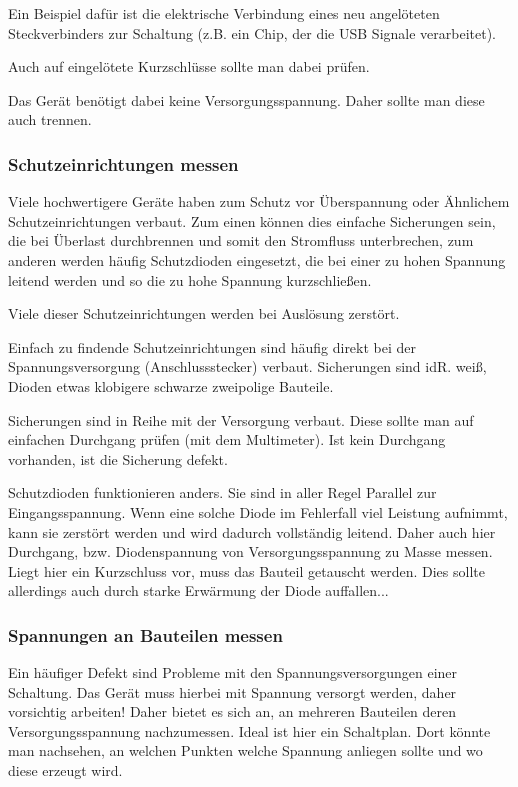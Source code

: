 Ein Beispiel dafür ist die elektrische Verbindung eines neu angelöteten Steckverbinders zur Schaltung (z.B. ein Chip, der die USB Signale verarbeitet).

Auch auf eingelötete Kurzschlüsse sollte man dabei prüfen.

Das Gerät benötigt dabei keine Versorgungsspannung.
Daher sollte man diese auch trennen.

\subsubsection{Schutzeinrichtungen messen}

Viele hochwertigere Geräte haben zum Schutz vor Überspannung oder Ähnlichem Schutzeinrichtungen verbaut.
Zum einen können dies einfache Sicherungen sein, die bei Überlast durchbrennen und somit den Stromfluss unterbrechen, zum anderen werden häufig Schutzdioden eingesetzt, die bei einer zu hohen Spannung leitend werden und so die zu hohe Spannung kurzschließen.

Viele dieser Schutzeinrichtungen werden bei Auslösung zerstört.

Einfach zu findende Schutzeinrichtungen sind häufig direkt bei der Spannungsversorgung (Anschlussstecker) verbaut. Sicherungen sind idR. weiß, Dioden etwas klobigere schwarze zweipolige Bauteile.

Sicherungen sind in Reihe mit der Versorgung verbaut. Diese sollte man auf einfachen Durchgang prüfen (mit dem Multimeter). Ist kein Durchgang vorhanden, ist die Sicherung defekt.

Schutzdioden funktionieren anders. Sie sind in aller Regel Parallel zur Eingangsspannung. Wenn eine solche Diode im Fehlerfall viel Leistung aufnimmt, kann sie zerstört werden und wird dadurch vollständig leitend. Daher auch hier Durchgang, bzw. Diodenspannung von Versorgungsspannung zu Masse messen.
Liegt hier ein Kurzschluss vor, muss das Bauteil getauscht werden. Dies sollte allerdings auch durch starke Erwärmung der Diode auffallen...

\subsubsection{Spannungen an Bauteilen messen}

Ein häufiger Defekt sind Probleme mit den Spannungsversorgungen einer Schaltung.
Das Gerät muss hierbei mit Spannung versorgt werden, daher vorsichtig arbeiten!
Daher bietet es sich an, an mehreren Bauteilen deren Versorgungsspannung nachzumessen.
Ideal ist hier ein Schaltplan. Dort könnte man nachsehen, an welchen Punkten welche Spannung anliegen sollte und wo diese erzeugt wird.

